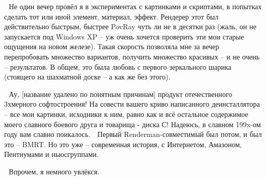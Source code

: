   Не один вечер
    провёл я в экспериментах с картинками и скриптами, в попытках
    сделать тот или иной элемент, материал, эффект. Рендерер этот был
    действительно быстрым, быстрее PovRay чуть ли не в десятки раз
    (жаль, он не запускается под Windows XP – уж очень хочется
    проверить эти мои старые ощущения на новом железе). Такая скорость
    позволяла мне за вечер перепробовать множество вариантов, получить
    множество красивых – и не очень – результатов. В общем, это была
    любовь с первого зеркального шарика (стоящего на шахматной доске –
    а как же без этого).

  Ау, [название
    удалено по понятным причинам] продукт отечественного 3хмерного
    софтостроения! На совести вашего криво написанного деинсталлятора –
    все мои картинки, исходники к ним, равно как и всё остальное
    содержимое моего славного боевого друга и товарища - диска С!
    Надеюсь, в славном 199x-ом году вам славно
    поикалось.
  
Первый
    Renderman-совместимый был потом, и был это – BMRT. Но это уже –
    современная история, с Интернетом, Амазоном, Пентиумами и
    ньюсгруппами.

  Впрочем, я немного увлёкся.